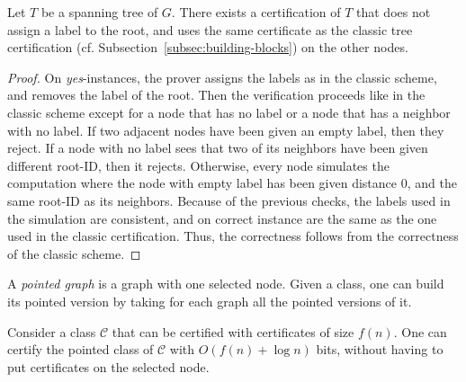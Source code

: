 \documentclass[a4paper,thm-restate,USenglish]{lipics-v2019}
\begin{document}
\begin{lemma}\label{lem:ST-with-no-root-label}
Let $T$ be a spanning tree of $G$. There exists a certification of $T$ that does not assign a label to the root, and uses the same certificate as the classic tree certification (cf. Subsection~\ref{subsec:building-blocks}) on the other nodes.
\end{lemma} 

\begin{proof}
On \emph{yes}-instances, the prover assigns the labels as in the classic scheme, and removes the label of the root.
Then the verification proceeds like in the classic scheme except for a node that has no label or a node that has a neighbor with no label. 
If two adjacent nodes have been given an empty label, then they reject. 
If a node with no label sees that two of its neighbors have been given different root-ID, then it rejects.
Otherwise, every node simulates the computation where the node with empty label has been given distance 0, and the same root-ID as its neighbors. 
Because of the previous checks, the labels used in the simulation are consistent, and on correct instance are the same as the one used in the classic certification.
Thus, the correctness follows from the correctness of the classic scheme.
\end{proof}

A \emph{pointed graph} is a graph with one selected node. Given a class, one can build its pointed version by taking for each graph all the pointed versions of it.

\begin{lemma}\label{lem:pointed}
Consider a class $\mathcal{C}$ that can be certified with certificates of size $f(n)$. 
One can certify the pointed class of $\mathcal{C}$ with  $O(f(n)+\log n)$ bits, without having to put certificates on the selected node. 
\end{lemma}
\end{document}
